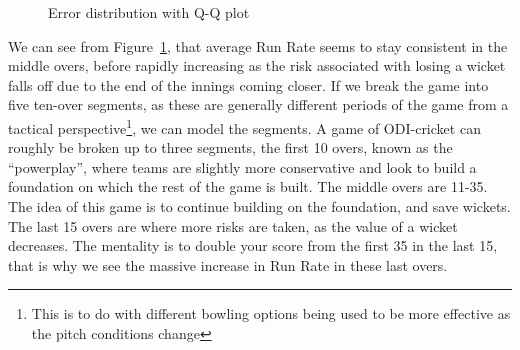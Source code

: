 \begin{figure}[h]
    \centering
    \qquad
    \caption{Error distribution with Q-Q plot}
    \label{errDistQQ3}
\end{figure}
\label{errdistqq3}
We can see from Figure~\ref{errDistQQ3}, that average Run Rate seems to stay consistent in the middle overs, before rapidly increasing as the risk associated with losing 
a wicket falls off due to the end of the innings coming closer. If we break the game into five ten-over segments, as these are generally different periods of the game
from a tactical perspective\footnote{This is to do with different bowling options being used to be more effective as the pitch conditions change}, we can model the segments.
A game of ODI-cricket can roughly be broken up to three segments, the first 10 overs, known as the ``powerplay'', where teams are slightly more conservative and look to build a 
foundation on which the rest of the game is built. The middle overs are 11-35. The idea of this game is to continue building on the foundation, and save wickets. The last 
15 overs are where more risks are taken, as the value of a wicket decreases. The mentality is to double your score from the first 35 in the last 15, that is why we see the massive 
increase in Run Rate in these last overs. \\

